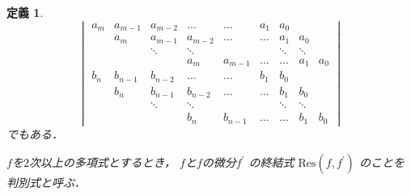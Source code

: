 \documentclass[leqno, a4paper, 12pt]{jsarticle}
\newtheorem{df}[thm]{定義}
\newcommand{\myres}{\mathrm{Res}}
\begin{document}
\begin{df}
\[\begin{vmatrix}
a_{m}& a_{m-1}& a_{m-2}& \dots & \dots & a_{1} & a_{0} & & \\
 & a_{m}& a_{m-1}& a_{m-2}& \dots & \dots & a_{1} & a_{0} &\\
  & &\ddots &\ddots & &  & \ddots &\ddots & \\
  &&&a_{m}&  a_{m-1}& \dots&\dots &a_{1}& a_{0}\\
  b_{n}& b_{n-1}& b_{n-2}& \dots & \dots & b_{1} & b_{0} & & \\
 & b_{n}& b_{n-1}& b_{n-2}& \dots & \dots & b_{1} & b_{0} &\\
  & &\ddots &\ddots & &  & \ddots &\ddots & \\
  &&&b_{n}&  b_{n-1}& \dots&\dots &b_{1}& b_{0}
\end{vmatrix}
\]
でもある．

$f$を$2$次以上の多項式とするとき，
$f$と$f$の微分$f^{\prime}$
の終結式 $\myres(f, f^{\prime})$
のことを判別式と呼ぶ．
\end{df}
\end{document}

